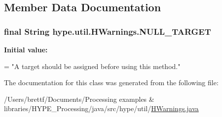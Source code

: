 \subsection{Member Data Documentation}
\hypertarget{classhype_1_1util_1_1_h_warnings_a8992fc45f97be882c79eceb0df3b4cec}{
\subsubsection[{N\-U\-L\-L\-\_\-\-T\-A\-R\-G\-E\-T}]{\setlength{\rightskip}{0pt plus 5cm}final String hype.\-util.\-H\-Warnings.\-N\-U\-L\-L\-\_\-\-T\-A\-R\-G\-E\-T\hspace{0.3cm}{\ttfamily [static]}}}\label{classhype_1_1util_1_1_h_warnings_a8992fc45f97be882c79eceb0df3b4cec}
{\bfseries Initial value\-:}
\begin{DoxyCode}
=
        \textcolor{stringliteral}{"A target should be assigned before using this method."}
\end{DoxyCode}


The documentation for this class was generated from the following file\-:\begin{DoxyCompactItemize}
\item 
/\-Users/brettf/\-Documents/\-Processing examples \& libraries/\-H\-Y\-P\-E\-\_\-\-Processing/java/src/hype/util/\hyperlink{_h_warnings_8java}{H\-Warnings.\-java}\end{DoxyCompactItemize}
